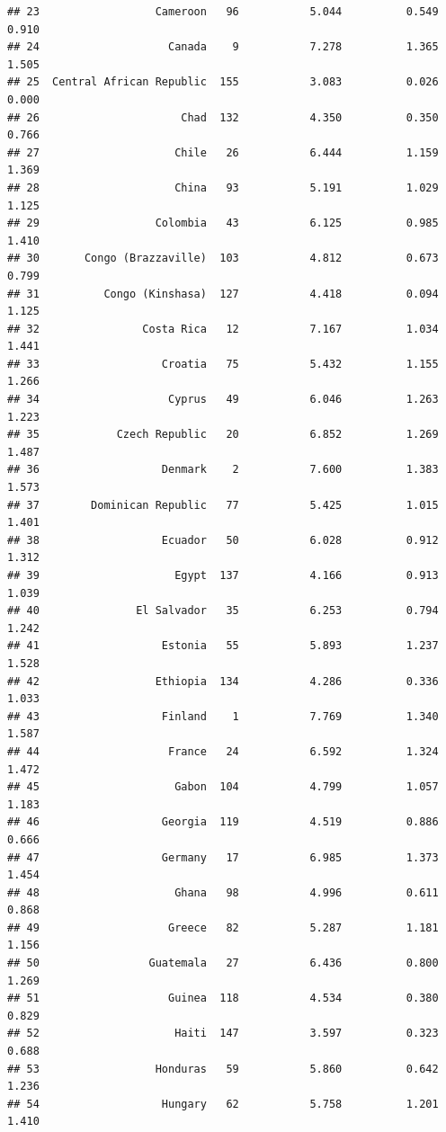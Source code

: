 \documentclass[]{article}
\begin{document}
\begin{verbatim}
## 23                  Cameroon   96           5.044          0.549          0.910
## 24                    Canada    9           7.278          1.365          1.505
## 25  Central African Republic  155           3.083          0.026          0.000
## 26                      Chad  132           4.350          0.350          0.766
## 27                     Chile   26           6.444          1.159          1.369
## 28                     China   93           5.191          1.029          1.125
## 29                  Colombia   43           6.125          0.985          1.410
## 30       Congo (Brazzaville)  103           4.812          0.673          0.799
## 31          Congo (Kinshasa)  127           4.418          0.094          1.125
## 32                Costa Rica   12           7.167          1.034          1.441
## 33                   Croatia   75           5.432          1.155          1.266
## 34                    Cyprus   49           6.046          1.263          1.223
## 35            Czech Republic   20           6.852          1.269          1.487
## 36                   Denmark    2           7.600          1.383          1.573
## 37        Dominican Republic   77           5.425          1.015          1.401
## 38                   Ecuador   50           6.028          0.912          1.312
## 39                     Egypt  137           4.166          0.913          1.039
## 40               El Salvador   35           6.253          0.794          1.242
## 41                   Estonia   55           5.893          1.237          1.528
## 42                  Ethiopia  134           4.286          0.336          1.033
## 43                   Finland    1           7.769          1.340          1.587
## 44                    France   24           6.592          1.324          1.472
## 45                     Gabon  104           4.799          1.057          1.183
## 46                   Georgia  119           4.519          0.886          0.666
## 47                   Germany   17           6.985          1.373          1.454
## 48                     Ghana   98           4.996          0.611          0.868
## 49                    Greece   82           5.287          1.181          1.156
## 50                 Guatemala   27           6.436          0.800          1.269
## 51                    Guinea  118           4.534          0.380          0.829
## 52                     Haiti  147           3.597          0.323          0.688
## 53                  Honduras   59           5.860          0.642          1.236
## 54                   Hungary   62           5.758          1.201          1.410

\end{verbatim}
\end{document}

